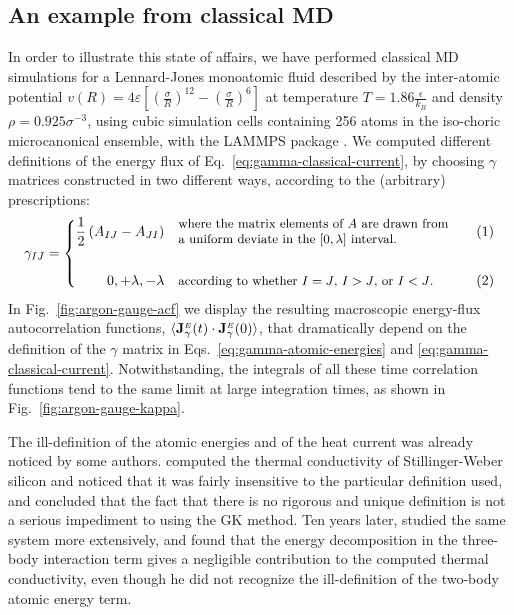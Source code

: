 \subsection{An example from classical MD}
In order to illustrate this state of affairs, we have performed classical MD simulations for a Lennard-Jones monoatomic fluid described by the inter-atomic potential $v(R) = 4\varepsilon \left[ \left( \frac{\sigma}{R}\right)^{12} - \left(\frac{\sigma}{R} \right)^{6} \right]$ at temperature $T=1.86 \frac{\epsilon}{k_B}$ and density $\rho=0.925 \sigma^{-3}$, using cubic simulation cells containing 256 atoms in the iso-choric microcanonical ensemble, with the LAMMPS package \cite{LAMMPS1995}. 
We computed different definitions of the energy flux of Eq.~\eqref{eq:gamma-classical-current}, by choosing $\gamma$ matrices constructed in two different ways, according to the (arbitrary) prescriptions:
\begin{equation}
\setbox0=\vbox{\hsize=68mm \small\noindent where the matrix
      elements of $A$ are drawn from a uniform deviate  in the
      $[0,\lambda]$ interval.}
\setbox1 \vbox{\hsize=68mm \small\noindent according to whether $I=J$,
  $I>J$, or $I<J$.}
\gamma_{IJ}= \left \{
  \begin{alignedat}{2}
    \frac{1}{2} \left(A_{IJ}-A_{JI}\right ) & \quad\raise -0.3\ht0
    \box0 && \qquad (1) \\
\\
    0, +\lambda, -\lambda & \quad \box1 && \qquad (2) \\
  \end{alignedat} \right .
\label{eq:gamma-definitions}
\end{equation}
In Fig.~\ref{fig:argon-gauge-acf} we display the resulting macroscopic energy-flux autocorrelation functions, $\langle \mathbf{J}_{\gamma}^{{\scriptscriptstyle E}}(t) \cdot \mathbf{J}_{\gamma}^{{\scriptscriptstyle E}}(0) \rangle$, that dramatically depend on the definition of the $\gamma$ matrix in Eqs.~\eqref{eq:gamma-atomic-energies} and \eqref{eq:gamma-classical-current}.  Notwithstanding, the integrals of all these time correlation functions tend to the same limit at large integration times, as shown in Fig.~\ref{fig:argon-gauge-kappa}.

The ill-definition of the atomic energies and of the heat current was already noticed by some authors. \citet{Schelling2002} computed the thermal conductivity of Stillinger-Weber \cite{Stillinger1985} silicon and noticed that it was fairly insensitive to the particular definition used, and concluded that the fact that there is no rigorous and unique definition is not a serious impediment to using the GK method. Ten years later, \citet{Howell2012} studied the same system more extensively, and found that the energy decomposition in the three-body interaction term gives a negligible contribution to the computed thermal conductivity, even though he did not recognize the ill-definition of the two-body atomic energy term.

